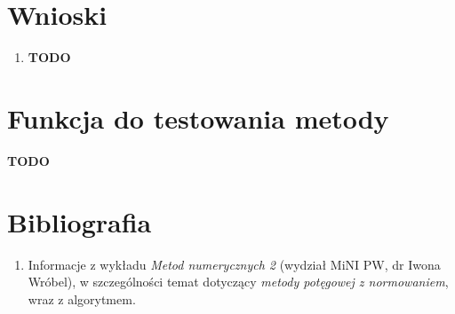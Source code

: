 \documentclass[12pt]{article}
\begin{document}
	
	
	
	\section{Wnioski}
	\begin{enumerate}
		\item \textbf{TODO}
	\end{enumerate}
	
	
	
	\section{Funkcja do testowania metody}
	\textbf{TODO}
	
	
	
	\section{Bibliografia}
	\begin{enumerate}
		\item Informacje z wykładu \textit{Metod numerycznych 2} (wydział MiNI PW, dr Iwona Wróbel), w szczególności temat dotyczący \textit{metody potęgowej z normowaniem}, wraz z algorytmem.
	\end{enumerate}
	
\end{document}

